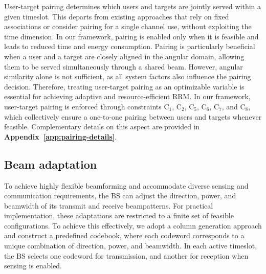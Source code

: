 \documentclass[10pt,journal,compsoc]{IEEEtran}
\theoremstyle{myremark}
\theoremstyle{myexample}
\begin{document}
User-target pairing determines which users and targets are jointly served within a given timeslot. This departs from existing approaches that rely on fixed associations or consider pairing for a single channel use, without exploiting the time dimension. In our framework, pairing is enabled only when it is feasible and leads to reduced time and energy consumption. Pairing is particularly beneficial when a user and a target are closely aligned in the angular domain, allowing them to be served simultaneously through a shared beam. However, angular similarity alone is not sufficient, as all system factors also influence the pairing decision. Therefore, treating user-target pairing as an optimizable variable is essential for achieving adaptive and resource-efficient \gls{RRM}. In our framework, user-target pairing is enforced through constraints $ \mathrm{C}_{1} $, $ \mathrm{C}_{2} $, $ \mathrm{C}_{5} $, $ \mathrm{C}_{6} $, $ \mathrm{C}_{7} $, and $ \mathrm{C}_{8} $, which collectively ensure a one-to-one pairing between users and targets whenever feasible. Complementary details on this aspect are provided in \textbf{Appendix~\ref{app:pairing-details}}.





 


\subsection{Beam adaptation} 

To achieve highly flexible beamforming and accommodate diverse sensing and communication requirements, the \gls{BS} can adjust the direction, power, and beamwidth of its transmit and receive beampatterns. For practical implementation, these adaptations are restricted to a finite set of feasible configurations. To achieve this effectively, we adopt a column generation approach \cite{desaulniers2005:column-generation} and construct a predefined codebook, where each codeword corresponds to a unique combination of direction, power, and beamwidth. In each active timeslot, the \gls{BS} selects one codeword for transmission, and another for reception when sensing is enabled.
\end{document}
